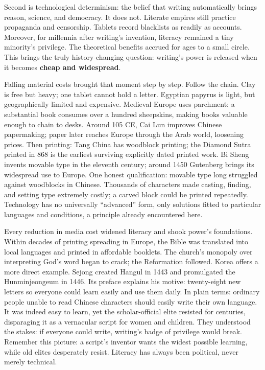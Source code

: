 Second is technological determinism: the belief that writing automatically brings reason, science, and democracy. It does not. Literate empires still practice propaganda and censorship. Tablets record blacklists as readily as accounts. Moreover, for millennia after writing's invention, literacy remained a tiny minority's privilege. The theoretical benefits accrued for ages to a small circle. This brings the truly history-changing question: writing's power is released when it becomes \textbf{cheap and widespread}.

Falling material costs brought that moment step by step. Follow the chain. Clay is free but heavy; one tablet cannot hold a letter. Egyptian papyrus is light, but geographically limited and expensive. Medieval Europe uses parchment: a substantial book consumes over a hundred sheepskins, making books valuable enough to chain to desks. Around 105 CE, Cai Lun improves Chinese papermaking; paper later reaches Europe through the Arab world, loosening prices. Then printing: Tang China has woodblock printing; the Diamond Sutra printed in 868 is the earliest surviving explicitly dated printed work. Bi Sheng invents movable type in the eleventh century; around 1450 Gutenberg brings its widespread use to Europe. One honest qualification: movable type long struggled against woodblocks in Chinese. Thousands of characters made casting, finding, and setting type extremely costly; a carved block could be printed repeatedly. Technology has no universally ``advanced'' form, only solutions fitted to particular languages and conditions, a principle already encountered here.

Every reduction in media cost widened literacy and shook power's foundations. Within decades of printing spreading in Europe, the Bible was translated into local languages and printed in affordable booklets. The church's monopoly over interpreting God's word began to crack; the Reformation followed. Korea offers a more direct example. Sejong created Hangul in 1443 and promulgated the Hunminjeongeum in 1446. Its preface explains his motive: twenty-eight new letters so everyone could learn easily and use them daily. In plain terms: ordinary people unable to read Chinese characters should easily write their own language. It was indeed easy to learn, yet the scholar-official elite resisted for centuries, disparaging it as a vernacular script for women and children. They understood the stakes: if everyone could write, writing's badge of privilege would break. Remember this picture: a script's inventor wants the widest possible learning, while old elites desperately resist. Literacy has always been political, never merely technical.


